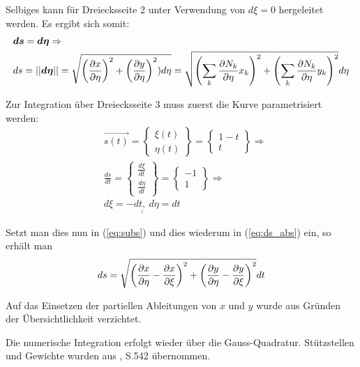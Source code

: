 Selbiges kann für Dreiecksseite 2 unter Verwendung von $d\xi = 0$ hergeleitet werden. Es ergibt sich somit:
\begin{align}
&\boldsymbol{ds} =  \boldsymbol{d\eta} \Rightarrow \nonumber \\
&ds = \left|\left| \boldsymbol{d\eta} \right|\right| = \sqrt{ \left(\frac{\partial x}{\partial \eta}\right)^2 + \left(\frac{\partial y}{\partial \eta}\right)^2) d\eta} = \sqrt{ \left( \sum\limits_{k}\frac{\partial N_k}{\partial \eta}x_k \right)^2  + \left( \sum\limits_{k}\frac{\partial N_k}{\partial \eta}y_k \right)^2 } d\eta
\end{align}

Zur Integration über Dreiecksseite 3  muss zuerst die Kurve parametrisiert werden:
\begin{align*}
&\vec{s(t)} = 
\begin{Bmatrix}
\xi(t) \\ \eta(t)
\end{Bmatrix} = 
\begin{Bmatrix}
1 - t \\ t
\end{Bmatrix} \Rightarrow\\
%
&\frac{ds}{dt} = 
\begin{Bmatrix}
\frac{d\xi}{dt} \\ \frac{d\eta}{dt}
\end{Bmatrix} = 
\begin{Bmatrix}
-1 \\ 1
\end{Bmatrix} \Rightarrow \\
% 
&\underline{\underline{d\xi = -dt, \ d\eta = dt}}
\end{align*}

Setzt man dies nun in (\ref{eq:subs}) und dies wiederum in (\ref{eq:ds_abs}) ein, so erhält man
\begin{equation}
ds = \sqrt{\left(\frac{\partial x}{\partial \eta} - \frac{\partial x}{\partial \xi}\right)^2  + \left(\frac{\partial y}{\partial \eta} - \frac{\partial y}{\partial \xi}\right)^2} dt
\end{equation}

Auf das Einsetzen der partiellen Ableitungen von $x$ und $y$ wurde aus Gründen der Übersichtlichkeit verzichtet.\newline


Die numerische Integration erfolgt wieder über die Gauss-Quadratur. Stützstellen und Gewichte wurden aus \cite{bathe}, S.542 übernommen.